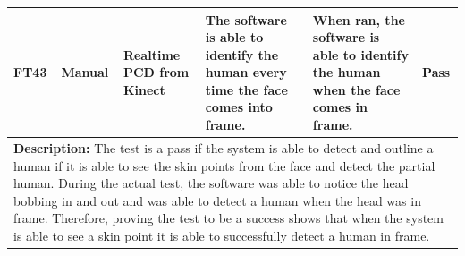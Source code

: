 \documentclass[12pt, titlepage]{article}
\begin{document}
\begin{table}[H]
{\begin{tabular}{|p{1.5cm}|p{2.5cm}|p{3cm}|p{4cm}|p{4cm}|p{1.8cm}|}
      \hline
      FT43 & Manual & \raggedright Realtime PCD from Kinect \par & \raggedright The software is able to identify the human every time the face comes into frame. \par & \raggedright When ran, the software is able to identify the human when the face comes in frame. \par & Pass \\
      \hline
      \multicolumn{6}{|p{\textwidth}|}{\raggedright \textbf{Description:} The test is a pass if the system is able to detect and outline a human if it is able to see the skin points from the face and detect the partial human. During the actual test, the software was able to notice the head bobbing in and out and was able to detect a human when the head was in frame. Therefore, proving the test to be a success shows that when the system is able to see a skin point it is able to successfully detect a human in frame. \par} \\
      \hline
  \end{tabular}
  }
\end{table}
\end{document}
